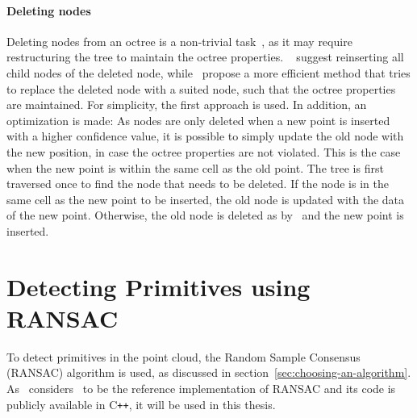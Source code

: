 \paragraph{Deleting nodes}
Deleting nodes from an octree is a non-trivial task~\parencite{samet_design_1989, finkel_quad_1974}, as it may require restructuring the tree to maintain the octree properties.
\citeauthor{finkel_quad_1974}~\parencite{finkel_quad_1974} suggest reinserting all child nodes of the deleted node,
while~\cite{samet_deletion_1980} propose a more efficient method that tries to replace the deleted node with a suited node, such that the octree properties are maintained.
For simplicity, the first approach is used.
In addition, an optimization is made:
As nodes are only deleted when a new point is inserted with a higher confidence value,
it is possible to simply update the old node with the new position, in case the octree properties are not violated.
This is the case when the new point is within the same cell as the old point.
The tree is first traversed once to find the node that needs to be deleted.
If the node is in the same cell as the new point to be inserted, the old node is updated with the data of the new point.
Otherwise, the old node is deleted as by~\cite{finkel_quad_1974} and the new point is inserted.


\section{Detecting Primitives using RANSAC}\label{sec:detecting-primitives-using-ransac}

To detect primitives in the point cloud, the Random Sample Consensus (RANSAC) algorithm is used,
as discussed in section~\ref{sec:choosing-an-algorithm}.
As~\cite{kaiser_survey_2019} considers~\parencite{schnabel_efficient_2007} to be the reference implementation of RANSAC
and its code is publicly available in C\texttt{++}, it will be used in this thesis.

